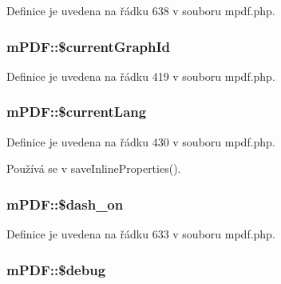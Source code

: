 Definice je uvedena na řádku 638 v souboru mpdf.\-php.

\hypertarget{classm_p_d_f_a184bfad25a884f52e1f95dce3d1af9e1}{
\subsubsection[{\$current\-Graph\-Id}]{\setlength{\rightskip}{0pt plus 5cm}m\-P\-D\-F\-::\$current\-Graph\-Id}}\label{classm_p_d_f_a184bfad25a884f52e1f95dce3d1af9e1}


Definice je uvedena na řádku 419 v souboru mpdf.\-php.

\hypertarget{classm_p_d_f_a72a159c92a387b10f7da9703b9db59f5}{
\subsubsection[{\$current\-Lang}]{\setlength{\rightskip}{0pt plus 5cm}m\-P\-D\-F\-::\$current\-Lang}}\label{classm_p_d_f_a72a159c92a387b10f7da9703b9db59f5}


Definice je uvedena na řádku 430 v souboru mpdf.\-php.



Používá se v save\-Inline\-Properties().

\hypertarget{classm_p_d_f_ac03fb4d5c4af846f1f8485b8ca0f9c6b}{
\subsubsection[{\$dash\-\_\-on}]{\setlength{\rightskip}{0pt plus 5cm}m\-P\-D\-F\-::\$dash\-\_\-on}}\label{classm_p_d_f_ac03fb4d5c4af846f1f8485b8ca0f9c6b}


Definice je uvedena na řádku 633 v souboru mpdf.\-php.

\hypertarget{classm_p_d_f_aadac27c9c4ea10e4f5a1677a221ea7d1}{
\subsubsection[{\$debug}]{\setlength{\rightskip}{0pt plus 5cm}m\-P\-D\-F\-::\$debug}}\label{classm_p_d_f_aadac27c9c4ea10e4f5a1677a221ea7d1}


